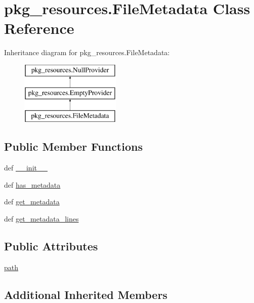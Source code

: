 \hypertarget{classpkg__resources_1_1FileMetadata}{}\section{pkg\+\_\+resources.\+File\+Metadata Class Reference}
\label{classpkg__resources_1_1FileMetadata}
Inheritance diagram for pkg\+\_\+resources.\+File\+Metadata\+:\begin{figure}[H]
\begin{center}
\leavevmode
\includegraphics[height=3.000000cm]{classpkg__resources_1_1FileMetadata}
\end{center}
\end{figure}
\subsection*{Public Member Functions}
\begin{DoxyCompactItemize}
\item 
def \hyperlink{classpkg__resources_1_1FileMetadata_aae603592f188a3bd93f35dcea74d61a7}{\+\_\+\+\_\+init\+\_\+\+\_\+}
\item 
def \hyperlink{classpkg__resources_1_1FileMetadata_a0bd766f635c4298094d1222e0121d1e2}{has\+\_\+metadata}
\item 
def \hyperlink{classpkg__resources_1_1FileMetadata_a27b39a10941cb623ef659865ba9bc39d}{get\+\_\+metadata}
\item 
def \hyperlink{classpkg__resources_1_1FileMetadata_a5e14084e01e48f94be8d64fad4e7c650}{get\+\_\+metadata\+\_\+lines}
\end{DoxyCompactItemize}
\subsection*{Public Attributes}
\begin{DoxyCompactItemize}
\item 
\hyperlink{classpkg__resources_1_1FileMetadata_a2855060a8b7e183c33be0b709c9288c7}{path}
\end{DoxyCompactItemize}
\subsection*{Additional Inherited Members}



